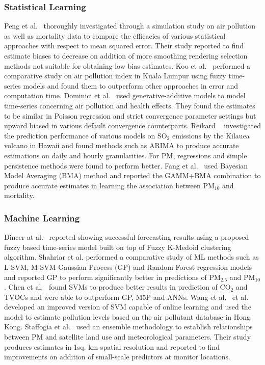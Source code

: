 \documentclass[10pt,journal]{IEEEtran}
\begin{document}
\subsubsection{Statistical Learning} Peng et al.~\cite{Peng.2006} thoroughly investigated through a simulation study on air pollution as well as mortality data to compare the efficacies of various statistical approaches with respect to mean squared error. Their study reported to find estimate biases to decrease on addition of more smoothing rendering selection methods not suitable for obtaining low bias estimates. Koo et al.~\cite{Koo.2020} performed a comparative study on air pollution index in Kuala Lumpur using fuzzy time-series models and found them to outperform other approaches in error and computation time. Dominici et al.~\cite{Dominici.2002} used generative-additive models to model time-series concerning air pollution and health effects. They found the estimates to be similar in Poisson regression and strict convergence parameter settings but upward biased in various default convergence counterparts. Reikard ~\cite{Reikard.2019} investigated the prediction performance of various models on SO${_2}$ emissions by the Kilauea volcano in Hawaii and found methods such as ARIMA to produce accurate estimations on daily and hourly granularities. For PM, regressions and simple persistence methods were found to perform better. Fang et al.~\cite{Fang.2016} used Bayesian Model Averaging (BMA) method and reported the GAMM+BMA combination to produce accurate estimates in learning the association between PM${_{10}}$ and mortality.

\subsubsection{Machine Learning} Dincer at al.~\cite{Dincer.2018} reported showing successful forecasting results using a proposed fuzzy based time-series model built on top of Fuzzy K-Medoid clustering algorithm. Shahriar et al.\cite{Shahriar.2020} performed a comparative study of ML methods such as L-SVM, M-SVM Gaussian Process (GP) and Random Forest regression models and reported GP to perform significantly better in predictions of PM${_{2.5}}$ and PM${_{10}}$. Chen et al.~\cite{Chen.2018} found SVMs to produce better results in prediction of CO${_2}$ and TVOCs and were able to outperform GP, M5P and ANNs. Wang et al.~\cite{Wang.2008} et al. developed an improved version of SVM capable of online learning and used the model to estimate pollution levels based on the air pollutant database in Hong Kong. Staffogia et al.~\cite{Staffogia.2019} used an ensemble methodology to establish relationships between PM and satellite land use and meteorological parameters. Their study produces estimates  in 1sq. km spatial resolution and reported to find improvements on addition of small-scale predictors at monitor locations.
\end{document}
